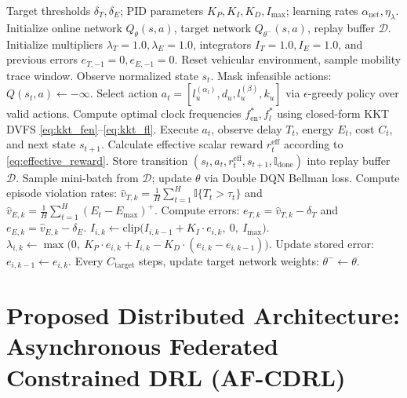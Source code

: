 \documentclass[12pt,a4paper]{article}
\begin{document}
\begin{algorithm}[htbp]
\caption{PID-Lagrangian Dueling Double DQN for Constrained VEC Offloading}
\label{alg:pid_lagrangian}
\begin{algorithmic}[1]
\Require Target thresholds $\delta_T, \delta_E$; PID parameters $K_P, K_I, K_D, I_{\max}$; learning rates $\alpha_{\mathrm{net}}, \eta_\lambda$.
\State Initialize online network $Q_\theta(s,a)$, target network $Q_{\theta^-}(s,a)$, replay buffer $\mathcal{D}$.
\State Initialize multipliers $\lambda_T = 1.0, \lambda_E = 1.0$, integrators $I_T = 1.0, I_E = 1.0$, and previous errors $e_{T,-1} = 0, e_{E,-1} = 0$.
    \State Reset vehicular environment, sample mobility trace window.
        \State Observe normalized state $s_t$. Mask infeasible actions: $Q(s_t, a) \leftarrow -\infty$.
        \State Select action $a_t = [l^{(\alpha_l)}_u, d_u, l^{(\beta)}_u, k_u]$ via $\epsilon$-greedy policy over valid actions.
        \State Compute optimal clock frequencies $f_{\mathrm{en}}^*, f_l^*$ using closed-form KKT DVFS \eqref{eq:kkt_fen}--\eqref{eq:kkt_fl}.
        \State Execute $a_t$, observe delay $T_t$, energy $E_t$, cost $C_t$, and next state $s_{t+1}$.
        \State Calculate effective scalar reward $r_t^{\mathrm{eff}}$ according to \eqref{eq:effective_reward}.
        \State Store transition $(s_t, a_t, r_t^{\mathrm{eff}}, s_{t+1}, \mathbb{I}_{\mathrm{done}})$ into replay buffer $\mathcal{D}$.
        \State Sample mini-batch from $\mathcal{D}$; update $\theta$ via Double DQN Bellman loss.
    \EndFor
    \State Compute episode violation rates: $\hat{v}_{T,k} = \frac{1}{H}\sum_{t=1}^H \mathbb{I}\{T_t > \tau_t\}$ and $\hat{v}_{E,k} = \frac{1}{H}\sum_{t=1}^H (E_t - E_{\max})^+$.
    \State Compute errors: $e_{T,k} = \hat{v}_{T,k} - \delta_T$ and $e_{E,k} = \hat{v}_{E,k} - \delta_E$.
        \State $I_{i,k} \leftarrow \mathrm{clip}\big(I_{i,k-1} + K_I \cdot e_{i,k},\ 0,\ I_{\max}\big)$.
        \State $\lambda_{i,k} \leftarrow \max\big(0,\ K_P \cdot e_{i,k} + I_{i,k} - K_D \cdot (e_{i,k} - e_{i,k-1})\big)$.
        \State Update stored error: $e_{i,k-1} \leftarrow e_{i,k}$.
    \EndFor
    \State Every $C_{\mathrm{target}}$ steps, update target network weights: $\theta^- \leftarrow \theta$.
\EndFor
\end{algorithmic}
\end{algorithm}

\section{Proposed Distributed Architecture: Asynchronous Federated Constrained DRL (AF-CDRL)}
\label{sec:af_cdrl}
\end{document}
